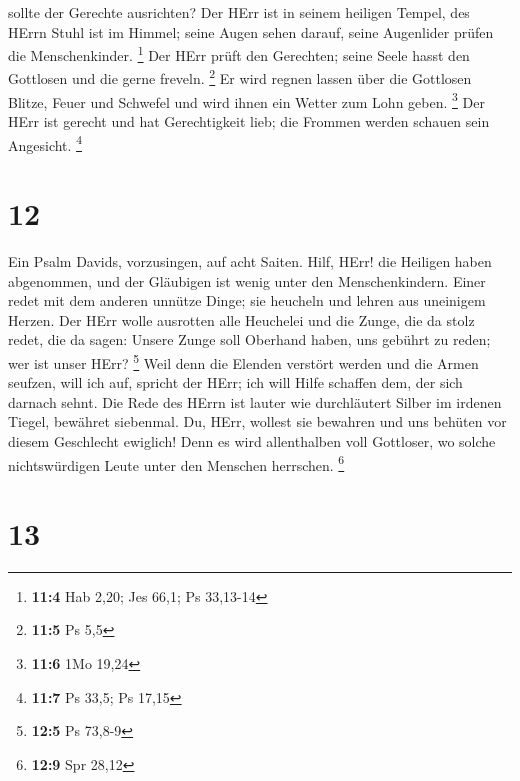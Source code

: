 sollte der Gerechte ausrichten?  Der HErr ist in seinem
heiligen Tempel, des HErrn Stuhl ist im Himmel; seine Augen sehen
darauf, seine Augenlider prüfen die Menschenkinder. \footnote{\textbf{11:4}
  Hab 2,20; Jes 66,1; Ps 33,13-14}  Der HErr prüft den
Gerechten; seine Seele hasst den Gottlosen und die gerne freveln.
\footnote{\textbf{11:5} Ps 5,5}  Er wird regnen lassen über
die Gottlosen Blitze, Feuer und Schwefel und wird ihnen ein Wetter zum
Lohn geben. \footnote{\textbf{11:6} 1Mo 19,24}  Der HErr ist
gerecht und hat Gerechtigkeit lieb; die Frommen werden schauen sein
Angesicht. \footnote{\textbf{11:7} Ps 33,5; Ps 17,15}

\hypertarget{section-6}{%
\section{12}\label{section-6}}

 Ein Psalm Davids, vorzusingen, auf acht Saiten.
 Hilf, HErr! die Heiligen haben abgenommen, und der
Gläubigen ist wenig unter den Menschenkindern.  Einer redet
mit dem anderen unnütze Dinge; sie heucheln und lehren aus uneinigem
Herzen.  Der HErr wolle ausrotten alle Heuchelei und die
Zunge, die da stolz redet,  die da sagen: Unsere Zunge soll
Oberhand haben, uns gebührt zu reden; wer ist unser HErr? \footnote{\textbf{12:5}
  Ps 73,8-9}  Weil denn die Elenden verstört werden und die
Armen seufzen, will ich auf, spricht der HErr; ich will Hilfe schaffen
dem, der sich darnach sehnt.  Die Rede des HErrn ist lauter
wie durchläutert Silber im irdenen Tiegel, bewähret siebenmal.
 Du, HErr, wollest sie bewahren und uns behüten vor diesem
Geschlecht ewiglich!  Denn es wird allenthalben voll
Gottloser, wo solche nichtswürdigen Leute unter den Menschen herrschen.
\footnote{\textbf{12:9} Spr 28,12}

\hypertarget{section-7}{%
\section{13}\label{section-7}}

